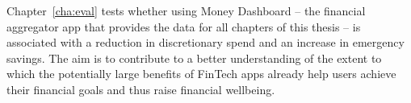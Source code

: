 Chapter~\ref{cha:eval} tests whether using Money Dashboard -- the financial
aggregator app that provides the data for all chapters of this thesis -- is
associated with a reduction in discretionary spend and an increase in emergency
savings. The aim is to contribute to a better understanding of the extent to
which the potentially large benefits of FinTech apps already help users achieve
their financial goals and thus raise financial wellbeing.
